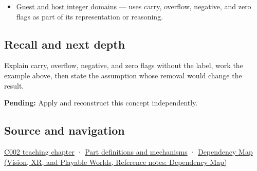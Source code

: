 \begin{itemize}
\tightlist
\item
  \hyperref[appendix-33e7a011b684]{Guest and host integer domains} --- uses carry, overflow, negative, and zero flags as part of its representation or reasoning.
\end{itemize}

\subsection{Recall and next depth}\label{appendix-8d687c9c08ab-recall-and-next-depth}

Explain carry, overflow, negative, and zero flags without the label, work the example above, then state the assumption whose removal would change the result.

\textbf{Pending:} Apply and reconstruct this concept independently.

\subsection{Source and navigation}\label{appendix-8d687c9c08ab-source-and-navigation}

\hyperref[01-foundations-i-ch001-arithmetic-becomes-a-policy]{C002 teaching chapter} · \hyperref[appendix-fd090d982a15]{Part definitions and mechanisms} · \href{../07-Vision-XR-and-Playable-Worlds/main.pdf\#nameddest=appendix-4ad47bdd269a}{Dependency Map (Vision, XR, and Playable Worlds, Reference notes: Dependency Map)}
